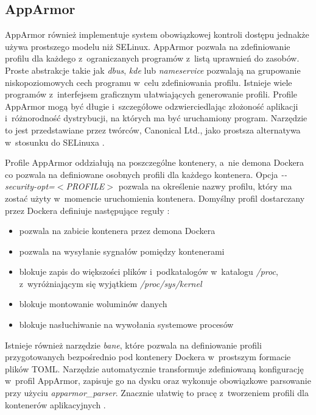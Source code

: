 \subsection{AppArmor}

AppArmor również implementuje system obowiązkowej kontroli dostępu jednakże używa prostszego modelu niż SELinux. AppArmor pozwala na zdefiniowanie profilu dla każdego z~ograniczanych programów z~listą uprawnień do zasobów. Proste abstrakcje takie jak \textit{dbus}, \textit{kde} lub \textit{nameservice} pozwalają na grupowanie niskopoziomowych cech programu w~celu zdefiniowania profilu. Istnieje wiele programów z~interfejsem graficznym ułatwiających generowanie profili. Profile AppArmor mogą być długie i~szczegółowe odzwierciedlając złożoność aplikacji i~różnorodność dystrybucji, na których ma być uruchamiony program. Narzędzie to jest przedstawiane przez twórców, Canonical Ltd., jako prostsza alternatywa w~stosunku do SELinuxa \cite{SchreudersEmpoweringEndUsersToConfineTheirOwnApplications}.

Profile AppArmor oddziałują na poszczególne kontenery, a~nie demona Dockera co pozwala na definiowane osobnych profili dla każdego kontenera. Opcja \textit{-{}-security-opt=$<$PROFILE$>$} pozwala na określenie nazwy profilu, który ma zostać użyty w~momencie uruchomienia kontenera. Domyślny profil dostarczany przez Dockera definiuje następujące reguły \cite{MobyDockerDefaultAppArmorProfile}:

\begin{itemize}
    \item pozwala na zabicie kontenera przez demona Dockera
    \item pozwala na wysyłanie sygnałów pomiędzy kontenerami
    \item blokuje zapis do większości plików i~podkatalogów w~katalogu \textit{/proc}, z~wyróżniającym się wyjątkiem \textit{/proc/sys/kernel}
    \item blokuje montowanie woluminów danych
    \item blokuje nasłuchiwanie na wywołania systemowe procesów
\end{itemize}

Istnieje również narzędzie \textit{bane}, które pozwala na definiowanie profili przygotowanych bezpośrednio pod kontenery Dockera w~prostszym formacie plików TOML. Narzędzie automatycznie transformuje zdefiniowaną konfigurację w~profil AppArmor, zapisuje go na dysku oraz wykonuje obowiązkowe parsowanie przy użyciu \textit{apparmor_parser}. Znacznie ułatwię to pracę z~tworzeniem profili dla kontenerów aplikacyjnych \cite{BaneRepository}.

